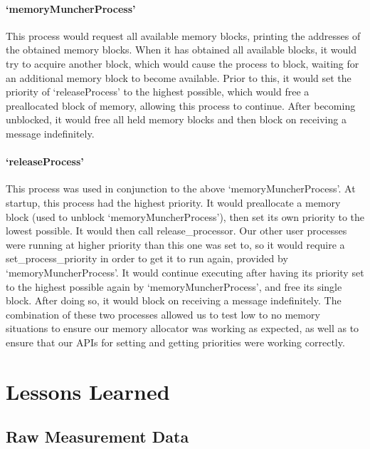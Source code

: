 \documentclass[12pt]{report}
\begin{document}
\subsection{`memoryMuncherProcess'}

    This process would request all available memory blocks, printing the
    addresses of the obtained memory blocks.  When it has obtained all available
    blocks, it would try to acquire another block, which would cause the process
    to block, waiting for an additional memory block to become available.  Prior
    to this, it would set the priority of `releaseProcess' to the highest
    possible, which would free a preallocated block of memory, allowing this
    process to continue.  After becoming unblocked, it would free all held
    memory blocks and then block on receiving a message indefinitely.

\subsection{`releaseProcess'}

    This process was used in conjunction to the above `memoryMuncherProcess'.
    At startup, this process had the highest priority.  It would preallocate a
    memory block (used to unblock `memoryMuncherProcess'), then set its own
    priority to the lowest possible.  It would then call release\_processor.
    Our other user processes were running at higher priority than this one was
    set to, so it would require a set\_process\_priority in order to get it to
    run again, provided by `memoryMuncherProcess'.  It would continue executing
    after having its priority set to the highest possible again by
    `memoryMuncherProcess', and free its single block.  After doing so, it would
    block on receiving a message indefinitely.  The combination of these two
    processes allowed us to test low to no memory situations to ensure our
    memory allocator was working as expected, as well as to ensure that our
    APIs for setting and getting priorities were working correctly.

\part{Lessons Learned}

\appendix
\chapter{Raw Measurement Data}
\label{appendix:raw_data}
\end{document}
